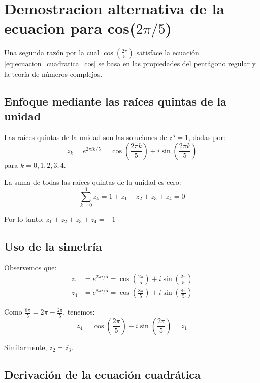 \section{Demostracion alternativa de la ecuacion para cos($2\pi/5$)}\label{sec:demostracion_alternativa}

Una segunda razón por la cual $\cos\left(\frac{2\pi}{5}\right)$ satisface la ecuación \eqref{eq:ecuacion_cuadratica_cos} se basa en las propiedades del pentágono regular y la teoría de números complejos.

\subsection{Enfoque mediante las raíces quintas de la unidad}

Las raíces quintas de la unidad son las soluciones de $z^5 = 1$, dadas por:
\begin{equation}\label{eq:raices_quintas}
z_k = e^{2\pi i k/5} = \cos\left(\frac{2\pi k}{5}\right) + i\sin\left(\frac{2\pi k}{5}\right)
\end{equation}
para $k = 0, 1, 2, 3, 4$.

La suma de todas las raíces quintas de la unidad es cero:
\begin{equation}\label{eq:suma_raices_quintas}
\sum_{k=0}^{4} z_k = 1 + z_1 + z_2 + z_3 + z_4 = 0
\end{equation}

Por lo tanto: $z_1 + z_2 + z_3 + z_4 = -1$

\subsection{Uso de la simetría}

Observemos que:
\begin{align}
z_1 &= e^{2\pi i/5} = \cos\left(\frac{2\pi}{5}\right) + i\sin\left(\frac{2\pi}{5}\right) \\
z_4 &= e^{8\pi i/5} = \cos\left(\frac{8\pi}{5}\right) + i\sin\left(\frac{8\pi}{5}\right)
\end{align}

Como $\frac{8\pi}{5} = 2\pi - \frac{2\pi}{5}$, tenemos:
\[
z_4 = \cos\left(\frac{2\pi}{5}\right) - i\sin\left(\frac{2\pi}{5}\right) = \overline{z_1}
\]

Similarmente, $z_2 = \overline{z_3}$.

\subsection{Derivación de la ecuación cuadrática}

